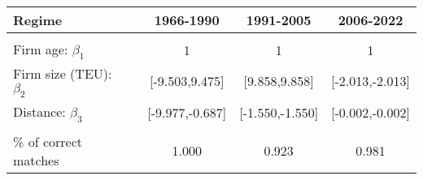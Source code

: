 
\begin{tabular}[t]{lcccc}
\toprule
Regime &  & 1966-1990 & 1991-2005 & 2006-2022\\
\midrule
 &  &  &  \vphantom{1} & \\
Firm age: $\beta_1$ &  & 1 & 1 & 1\\
Firm size (TEU): $\beta_2$ &  & {}[-9.503,9.475] & {}[9.858,9.858] & {}[-2.013,-2.013]\\
Distance: $\beta_3$ &  & {}[-9.977,-0.687] & {}[-1.550,-1.550] & {}[-0.002,-0.002]\\
 &  &  &  & \\
\% of correct matches &  & 1.000 & 0.923 & 0.981\\
\bottomrule
\end{tabular}
